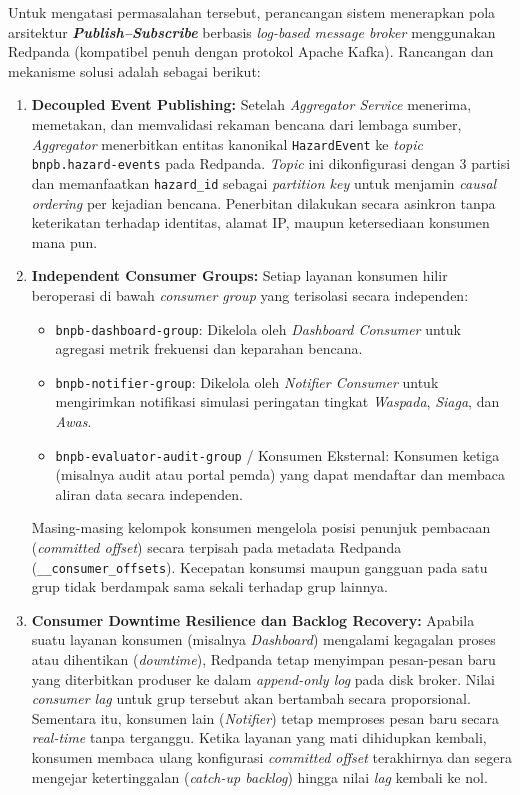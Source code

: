 Untuk mengatasi permasalahan tersebut, perancangan sistem menerapkan pola arsitektur \textbf{\textit{Publish--Subscribe}} berbasis \textit{log-based message broker} menggunakan Redpanda (kompatibel penuh dengan protokol Apache Kafka). Rancangan dan mekanisme solusi adalah sebagai berikut:
\begin{enumerate}
    \item \textbf{Decoupled Event Publishing:}
    Setelah \textit{Aggregator Service} menerima, memetakan, dan memvalidasi rekaman bencana dari lembaga sumber, \textit{Aggregator} menerbitkan entitas kanonikal \texttt{HazardEvent} ke \textit{topic} \texttt{bnpb.hazard-events} pada Redpanda. \textit{Topic} ini dikonfigurasi dengan 3 partisi dan memanfaatkan \texttt{hazard\_id} sebagai \textit{partition key} untuk menjamin \textit{causal ordering} per kejadian bencana. Penerbitan dilakukan secara asinkron tanpa keterikatan terhadap identitas, alamat IP, maupun ketersediaan konsumen mana pun.
    \item \textbf{Independent Consumer Groups:}
    Setiap layanan konsumen hilir beroperasi di bawah \textit{consumer group} yang terisolasi secara independen:
    \begin{itemize}
        \item \texttt{bnpb-dashboard-group}: Dikelola oleh \textit{Dashboard Consumer} untuk agregasi metrik frekuensi dan keparahan bencana.
        \item \texttt{bnpb-notifier-group}: Dikelola oleh \textit{Notifier Consumer} untuk mengirimkan notifikasi simulasi peringatan tingkat \textit{Waspada}, \textit{Siaga}, dan \textit{Awas}.
        \item \texttt{bnpb-evaluator-audit-group} / Konsumen Eksternal: Konsumen ketiga (misalnya audit atau portal pemda) yang dapat mendaftar dan membaca aliran data secara independen.
    \end{itemize}
    Masing-masing kelompok konsumen mengelola posisi penunjuk pembacaan (\textit{committed offset}) secara terpisah pada metadata Redpanda (\texttt{\_\_consumer\_offsets}). Kecepatan konsumsi maupun gangguan pada satu grup tidak berdampak sama sekali terhadap grup lainnya.
    \pagebreak
    \item \textbf{Consumer Downtime Resilience dan Backlog Recovery:}
    Apabila suatu layanan konsumen (misalnya \textit{Dashboard}) mengalami kegagalan proses atau dihentikan (\textit{downtime}), Redpanda tetap menyimpan pesan-pesan baru yang diterbitkan produser ke dalam \textit{append-only log} pada disk broker. Nilai \textit{consumer lag} untuk grup tersebut akan bertambah secara proporsional. Sementara itu, konsumen lain (\textit{Notifier}) tetap memproses pesan baru secara \textit{real-time} tanpa terganggu. Ketika layanan yang mati dihidupkan kembali, konsumen membaca ulang konfigurasi \textit{committed offset} terakhirnya dan segera mengejar ketertinggalan (\textit{catch-up backlog}) hingga nilai \textit{lag} kembali ke nol.

\end{enumerate}
